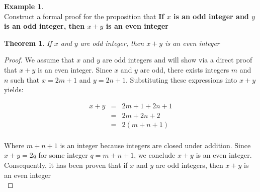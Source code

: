 \documentclass{book}
\newtheorem{theorem}{Theorem}[section]
\theoremstyle{definition}
\newtheorem{example}{Example}[definition]
\theoremstyle{remark}
\begin{document}
\begin{example}
\cite[Chap.1, P.C.1.9, Q.3]{ted} \\

Construct a formal proof for the proposition that {\bf If $x$ is an odd integer and $y$ is an odd integer, then $x + y$ is an even integer}

\begin{tcolorbox}
    \begin{theorem}
         If $x$ and $y$ are odd integer, then $x + y$ is an even integer
    \end{theorem}
\end{tcolorbox}

\begin{proof}
    We assume that $x$ and $y$ are odd integers and will show via a direct proof that $x + y$ is an even integer. Since $x$ and $y$ are odd, there exists integers $m$ and $n$ such that $x = 2m + 1$ and $y = 2n + 1$. Substituting these expressions into $x + y$ yields:
    
    \begin{eqnarray*}
        x + y & = & 2m + 1 + 2n + 1 \nonumber \\
        & = & 2m + 2n + 2 \nonumber \\
        & = & 2(m + n + 1) \nonumber \\
    \end{eqnarray*}
    
    Where $m + n + 1$ is an integer because integers are closed under addition. Since $x + y = 2q$ for some integer $q = m + n + 1$, we conclude $x + y$ is an even integer. Consequently, it has been proven that if $x$ and $y$ are odd integers, then $x + y$ is an even integer \\
\end{proof}
\end{example}
\end{document}
